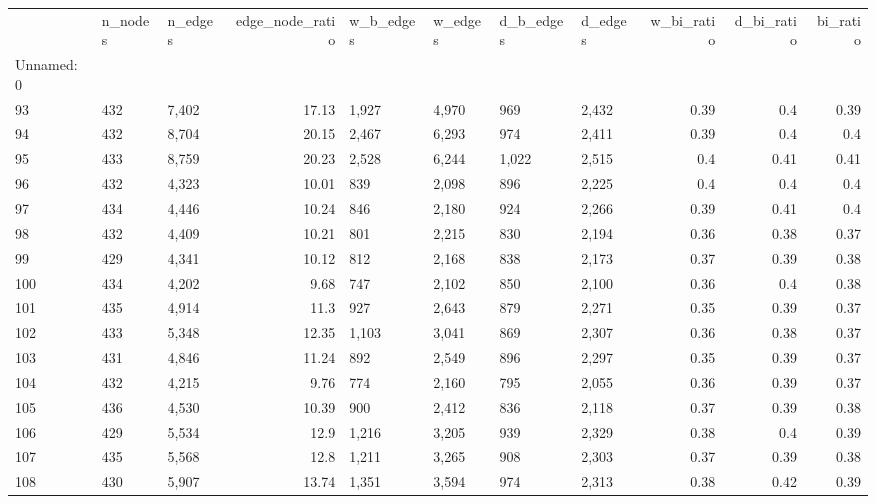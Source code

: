 \begin{tabular}{lllrllllrrr}
\toprule
{} & n\_nodes & n\_edges &  edge\_node\_ratio & w\_b\_edges & w\_edges & d\_b\_edges & d\_edges &  w\_bi\_ratio &  d\_bi\_ratio &  bi\_ratio \\
Unnamed: 0 &         &         &                  &           &         &           &         &             &             &           \\
\midrule
93         &     432 &   7,402 &            17.13 &     1,927 &   4,970 &       969 &   2,432 &        0.39 &         0.4 &      0.39 \\
94         &     432 &   8,704 &            20.15 &     2,467 &   6,293 &       974 &   2,411 &        0.39 &         0.4 &       0.4 \\
95         &     433 &   8,759 &            20.23 &     2,528 &   6,244 &     1,022 &   2,515 &         0.4 &        0.41 &      0.41 \\
96         &     432 &   4,323 &            10.01 &       839 &   2,098 &       896 &   2,225 &         0.4 &         0.4 &       0.4 \\
97         &     434 &   4,446 &            10.24 &       846 &   2,180 &       924 &   2,266 &        0.39 &        0.41 &       0.4 \\
98         &     432 &   4,409 &            10.21 &       801 &   2,215 &       830 &   2,194 &        0.36 &        0.38 &      0.37 \\
99         &     429 &   4,341 &            10.12 &       812 &   2,168 &       838 &   2,173 &        0.37 &        0.39 &      0.38 \\
100        &     434 &   4,202 &             9.68 &       747 &   2,102 &       850 &   2,100 &        0.36 &         0.4 &      0.38 \\
101        &     435 &   4,914 &             11.3 &       927 &   2,643 &       879 &   2,271 &        0.35 &        0.39 &      0.37 \\
102        &     433 &   5,348 &            12.35 &     1,103 &   3,041 &       869 &   2,307 &        0.36 &        0.38 &      0.37 \\
103        &     431 &   4,846 &            11.24 &       892 &   2,549 &       896 &   2,297 &        0.35 &        0.39 &      0.37 \\
104        &     432 &   4,215 &             9.76 &       774 &   2,160 &       795 &   2,055 &        0.36 &        0.39 &      0.37 \\
105        &     436 &   4,530 &            10.39 &       900 &   2,412 &       836 &   2,118 &        0.37 &        0.39 &      0.38 \\
106        &     429 &   5,534 &             12.9 &     1,216 &   3,205 &       939 &   2,329 &        0.38 &         0.4 &      0.39 \\
107        &     435 &   5,568 &             12.8 &     1,211 &   3,265 &       908 &   2,303 &        0.37 &        0.39 &      0.38 \\
108        &     430 &   5,907 &            13.74 &     1,351 &   3,594 &       974 &   2,313 &        0.38 &        0.42 &      0.39 \\
\bottomrule
\end{tabular}
